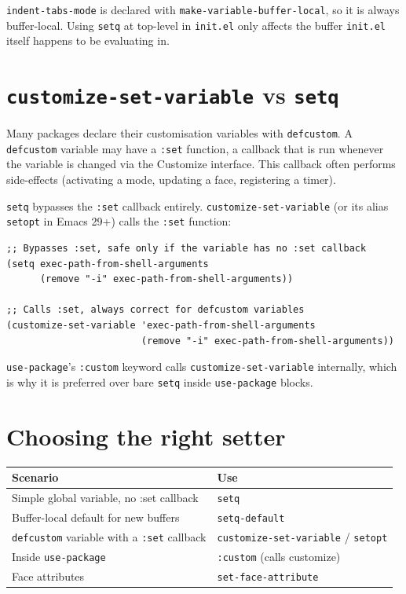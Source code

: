 \texttt{indent-tabs-mode} is declared with \texttt{make-variable-buffer-local}, so it is always buffer-local. Using \texttt{setq} at top-level in \texttt{init.el} only affects the buffer \texttt{init.el} itself happens to be evaluating in.

\section{\texttt{customize-set-variable} vs \texttt{setq}}\label{customize-set-variable-vs-setq}

Many packages declare their customisation variables with \texttt{defcustom}. A \texttt{defcustom} variable may have a \texttt{:set} function, a callback that is run whenever the variable is changed via the Customize interface. This callback often performs side-effects (activating a mode, updating a face, registering a timer).

\texttt{setq} bypasses the \texttt{:set} callback entirely. \texttt{customize-set-variable} (or its alias \texttt{setopt} in Emacs 29+) calls the \texttt{:set} function:

\begin{verbatim}
;; Bypasses :set, safe only if the variable has no :set callback
(setq exec-path-from-shell-arguments
      (remove "-i" exec-path-from-shell-arguments))

;; Calls :set, always correct for defcustom variables
(customize-set-variable 'exec-path-from-shell-arguments
                        (remove "-i" exec-path-from-shell-arguments))
\end{verbatim}

\texttt{use-package}'s \texttt{:custom} keyword calls \texttt{customize-set-variable} internally, which is why it is preferred over bare \texttt{setq} inside \texttt{use-package} blocks.

\section{Choosing the right setter}\label{choosing-the-right-setter}

\begin{longtable}[]{@{}ll@{}}
\toprule
Scenario & Use \\
\midrule
Simple global variable, no :set callback & \texttt{setq} \\
Buffer-local default for new buffers & \texttt{setq-default} \\
\texttt{defcustom} variable with a \texttt{:set} callback & \texttt{customize-set-variable} / \texttt{setopt} \\
Inside \texttt{use-package} & \texttt{:custom} (calls customize) \\
Face attributes & \texttt{set-face-attribute} \\
\bottomrule
\end{longtable}

